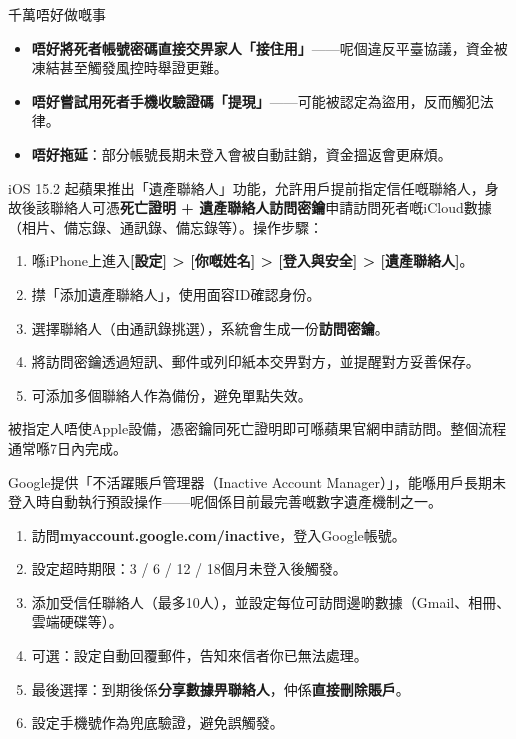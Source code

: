 \begin{tcbwarn}{千萬唔好做嘅事}
\begin{itemize}
  \item \textbf{唔好將死者帳號密碼直接交畀家人「接住用」}——呢個違反平臺協議，資金被凍結甚至觸發風控時舉證更難。
  \item \textbf{唔好嘗試用死者手機收驗證碼「提現」}——可能被認定為盜用，反而觸犯法律。
  \item \textbf{唔好拖延}：部分帳號長期未登入會被自動註銷，資金搵返會更麻煩。
\end{itemize}

\end{tcbwarn}


iOS 15.2 起蘋果推出「遺產聯絡人」功能，允許用戶提前指定信任嘅聯絡人，身故後該聯絡人可憑\textbf{死亡證明 + 遺產聯絡人訪問密鑰}申請訪問死者嘅iCloud數據（相片、備忘錄、通訊錄、備忘錄等）。操作步驟：

\begin{enumerate}
  \item 喺iPhone上進入\textbf{[設定] > [你嘅姓名] > [登入與安全] > [遺產聯絡人]}。
  \item 㩒「添加遺產聯絡人」，使用面容ID確認身份。
  \item 選擇聯絡人（由通訊錄挑選），系統會生成一份\textbf{訪問密鑰}。
  \item 將訪問密鑰透過短訊、郵件或列印紙本交畀對方，並提醒對方妥善保存。
  \item 可添加多個聯絡人作為備份，避免單點失效。
\end{enumerate}

被指定人唔使Apple設備，憑密鑰同死亡證明即可喺蘋果官網申請訪問。整個流程通常喺7日內完成。


Google提供「不活躍賬戶管理器（Inactive Account Manager）」，能喺用戶長期未登入時自動執行預設操作——呢個係目前最完善嘅數字遺產機制之一。

\begin{enumerate}
  \item 訪問\textbf{myaccount.google.com/inactive}，登入Google帳號。
  \item 設定超時期限：3 / 6 / 12 / 18個月未登入後觸發。
  \item 添加受信任聯絡人（最多10人），並設定每位可訪問邊啲數據（Gmail、相冊、雲端硬碟等）。
  \item 可選：設定自動回覆郵件，告知來信者你已無法處理。
  \item 最後選擇：到期後係\textbf{分享數據畀聯絡人}，仲係\textbf{直接刪除賬戶}。
  \item 設定手機號作為兜底驗證，避免誤觸發。
\end{enumerate}

